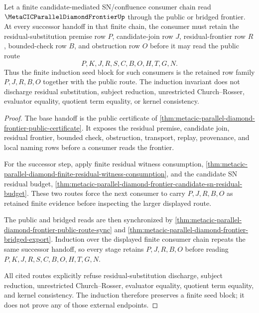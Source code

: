 \begin{theorem}
\label{thm:metacic-parallel-diamond-frontier-seed-block-sync}
Let a finite candidate-mediated SN/confluence consumer chain read $\MetaCICParallelDiamondFrontierUp$ through the public or bridged frontier. At every successor handoff in that finite chain, the consumer must retain the residual-substitution premise row $P$, candidate-join row $J$, residual-frontier row $R$, bounded-check row $B$, and obstruction row $O$ before it may read the public route
$$
P,K,J,R,S,C,B,O,H,T,G,N.
$$
Thus the finite induction seed block for such consumers is the retained row family $P,J,R,B,O$ together with the public route. The induction invariant does not discharge residual substitution, subject reduction, unrestricted Church--Rosser, evaluator equality, quotient term equality, or kernel consistency.
\end{theorem}
\begin{proof}
The base handoff is the public certificate of \autoref{thm:metacic-parallel-diamond-frontier-public-certificate}. It exposes the residual premise, candidate join, residual frontier, bounded check, obstruction, transport, replay, provenance, and local naming rows before a consumer reads the frontier.

For the successor step, apply finite residual witness consumption, \autoref{thm:metacic-parallel-diamond-finite-residual-witness-consumption}, and the candidate SN residual budget, \autoref{thm:metacic-parallel-diamond-frontier-candidate-sn-residual-budget}. These two routes force the next consumer to carry $P,J,R,B,O$ as retained finite evidence before inspecting the larger displayed route.

The public and bridged reads are then synchronized by \autoref{thm:metacic-parallel-diamond-frontier-public-route-sync} and \autoref{thm:metacic-parallel-diamond-frontier-bridged-export}. Induction over the displayed finite consumer chain repeats the same successor handoff, so every stage retains $P,J,R,B,O$ before reading $P,K,J,R,S,C,B,O,H,T,G,N$.

All cited routes explicitly refuse residual-substitution discharge, subject reduction, unrestricted Church--Rosser, evaluator equality, quotient term equality, and kernel consistency. The induction therefore preserves a finite seed block; it does not prove any of those external endpoints.
\end{proof}

